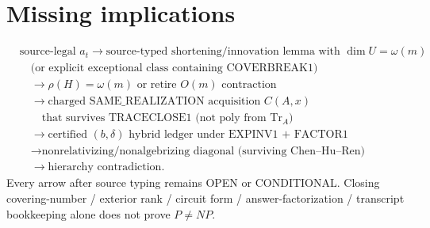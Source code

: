 \documentclass[11pt]{article}
\begin{document}
\section*{Missing implications}
\[
\begin{aligned}
&\text{source-legal }a_t
\to\text{source-typed shortening/innovation lemma with }\dim U=\omega(m)\\
&\quad\text{(or explicit exceptional class containing COVERBREAK1)}\\
&\quad\to\rho(H)=\omega(m)\text{ or retire }O(m)\text{ contraction}\\
&\quad\to\text{charged SAME\_REALIZATION acquisition }C(A,x)\\
&\quad\quad\text{that survives TRACECLOSE1 (not poly from }\operatorname{Tr}_A\text{)}\\
&\quad\to\text{certified }(b,\delta)\text{ hybrid ledger under EXPINV1 + FACTOR1}\\
&\quad\to\text{nonrelativizing/nonalgebrizing diagonal (surviving Chen--Hu--Ren)}\\
&\quad\to\text{hierarchy contradiction}.
\end{aligned}
\]
Every arrow after source typing remains OPEN or CONDITIONAL. Closing covering-number / exterior
rank / circuit form / answer-factorization / transcript bookkeeping alone does not prove $P\neq NP$.
\end{document}
